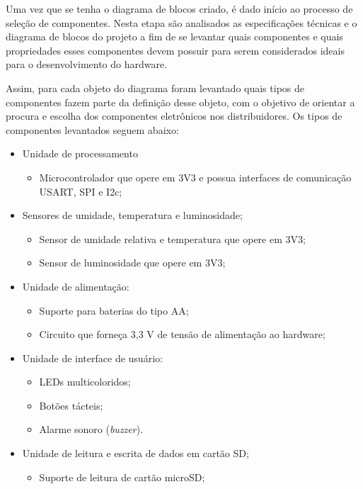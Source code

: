 Uma vez que se tenha o diagrama de blocos criado, é dado início ao processo de seleção de componentes. Nesta etapa são analisados as especificações técnicas e o diagrama de blocos do projeto a fim de se levantar quais componentes e quais propriedades esses componentes devem possuir para serem considerados ideais para o desenvolvimento do hardware. 

Assim, para cada objeto do diagrama foram levantado quais tipos de componentes fazem parte da definição desse objeto, com o objetivo de orientar a procura e escolha dos componentes eletrônicos nos distribuidores. Os tipos de componentes levantados seguem abaixo: 

\begin{itemize}
 
 \item Unidade de processamento
     \begin{itemize}
         \item Microcontrolador que opere em 3V3 e possua interfaces de comunicação USART, SPI e I2c;
     \end{itemize}

 \item Sensores de umidade, temperatura e luminosidade; 
  \begin{itemize}
     \item Sensor de umidade relativa e temperatura que opere em 3V3;
     \item Sensor de luminosidade que opere em 3V3;
 \end{itemize}
 
 \item Unidade de alimentação:
     \begin{itemize}
         \item Suporte para baterias do tipo AA;
         \item Circuito que forneça 3,3 V de tensão de alimentação ao hardware;
    \end{itemize} 

\item Unidade de interface de usuário: 

    \begin{itemize}
        \item LEDs multicoloridos;
        \item Botões tácteis;
        \item Alarme sonoro (\textit{buzzer}).
    \end{itemize}
 
 \item Unidade de leitura e escrita de dados em cartão SD;
     \begin{itemize}
         \item Suporte de leitura de cartão microSD;
     \end{itemize}
\end{itemize}
